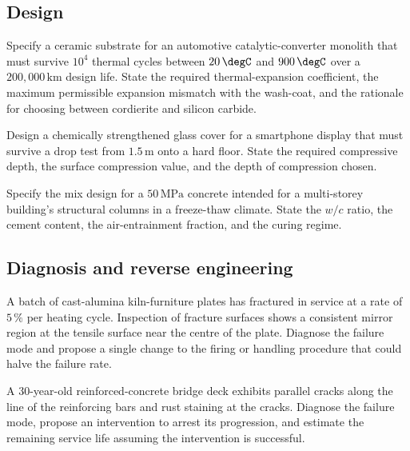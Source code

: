 \subsection*{Design}

\begin{exercise}
Specify a ceramic substrate for an automotive catalytic-converter
monolith that must survive $10^4$ thermal cycles between $20\,\degC$
and $900\,\degC$ over a $200{,}000\,\text{km}$ design life. State the
required thermal-expansion coefficient, the maximum permissible
expansion mismatch with the wash-coat, and the rationale for choosing
between cordierite and silicon carbide.
\end{exercise}

\begin{exercise}
Design a chemically strengthened glass cover for a smartphone display
that must survive a drop test from $1.5\,\text{m}$ onto a hard floor.
State the required compressive depth, the surface compression value,
and the depth of compression chosen.
\end{exercise}

\begin{exercise}
Specify the mix design for a $50\,\text{MPa}$ concrete intended for a
multi-storey building's structural columns in a freeze-thaw climate.
State the $w/c$ ratio, the cement content, the air-entrainment
fraction, and the curing regime.
\end{exercise}

\subsection*{Diagnosis and reverse engineering}

\begin{exercise}
A batch of cast-alumina kiln-furniture plates has fractured in service
at a rate of $5\,\%$ per heating cycle. Inspection of fracture surfaces
shows a consistent mirror region at the tensile surface near the centre
of the plate. Diagnose the failure mode and propose a single change to
the firing or handling procedure that could halve the failure rate.
\end{exercise}

\begin{exercise}
A 30-year-old reinforced-concrete bridge deck exhibits parallel cracks
along the line of the reinforcing bars and rust staining at the cracks.
Diagnose the failure mode, propose an intervention to arrest its
progression, and estimate the remaining service life assuming the
intervention is successful.
\end{exercise}

